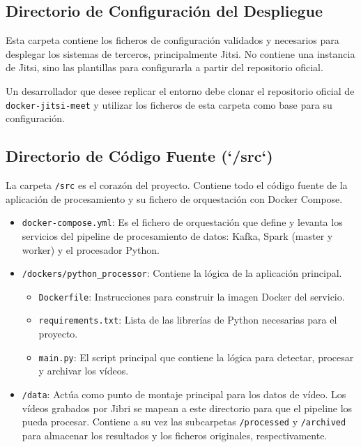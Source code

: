 \subsection{Directorio de Configuración del Despliegue}
Esta carpeta contiene los ficheros de configuración validados y necesarios para desplegar los sistemas de terceros, principalmente Jitsi. No contiene una instancia de Jitsi, sino las plantillas para configurarla a partir del repositorio oficial.

Un desarrollador que desee replicar el entorno debe clonar el repositorio oficial de \texttt{docker-jitsi-meet} y utilizar los ficheros de esta carpeta como base para su configuración.

\subsection{Directorio de Código Fuente (`/src`)}
La carpeta \texttt{/src} es el corazón del proyecto. Contiene todo el código fuente de la aplicación de procesamiento y su fichero de orquestación con Docker Compose.


\begin{itemize}
    \item \texttt{docker-compose.yml}: Es el fichero de orquestación que define y levanta los servicios del pipeline de procesamiento de datos: Kafka, Spark (master y worker) y el procesador Python.
    \item \texttt{/dockers/python\_processor}: Contiene la lógica de la aplicación principal.
        \begin{itemize}
            \item \texttt{Dockerfile}: Instrucciones para construir la imagen Docker del servicio.
            \item \texttt{requirements.txt}: Lista de las librerías de Python necesarias para el proyecto.
            \item \texttt{main.py}: El script principal que contiene la lógica para detectar, procesar y archivar los vídeos.
        \end{itemize}
    \item \texttt{/data}: Actúa como punto de montaje principal para los datos de vídeo. Los vídeos grabados por Jibri se mapean a este directorio para que el pipeline los pueda procesar. Contiene a su vez las subcarpetas \texttt{/processed} y \texttt{/archived} para almacenar los resultados y los ficheros originales, respectivamente.
\end{itemize}

